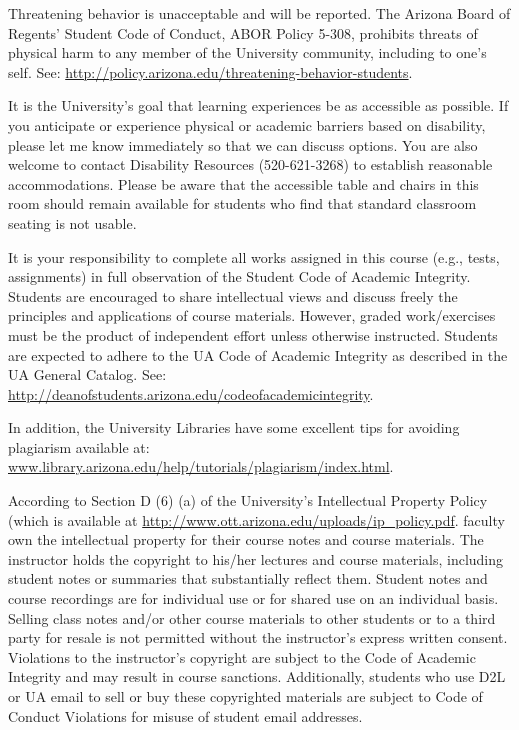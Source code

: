 \documentclass[
]{book}
\begin{document}
Threatening behavior is unacceptable and will be reported. The Arizona Board of Regents' Student Code of Conduct, ABOR Policy 5-308, prohibits threats of physical harm to any member of the University community, including to one's self. See: \url{http://policy.arizona.edu/threatening-behavior-students}.

It is the University's goal that learning experiences be as accessible as possible. If you anticipate or experience physical or academic barriers based on disability, please let me know immediately so that we can discuss options. You are also welcome to contact Disability Resources (520-621-3268) to establish reasonable accommodations. Please be aware that the accessible table and chairs in this room should remain available for students who find that standard classroom seating is not usable.

It is your responsibility to complete all works assigned in this course (e.g., tests, assignments) in full observation of the Student Code of Academic Integrity. Students are encouraged to share intellectual views and discuss freely the principles and applications of course materials. However, graded work/exercises must be the product of independent effort unless otherwise instructed. Students are expected to adhere to the UA Code of Academic Integrity as described in the UA General Catalog. See: \url{http://deanofstudents.arizona.edu/codeofacademicintegrity}.

In addition, the University Libraries have some excellent tips for avoiding plagiarism available at: \href{http:///url\%7Bwww.library.arizona.edu/help/tutorials/plagiarism/index.html}{www.library.arizona.edu/help/tutorials/plagiarism/index.html}.

According to Section D (6) (a) of the University's Intellectual Property Policy (which is available at \url{http://www.ott.arizona.edu/uploads/ip_policy.pdf}. faculty own the intellectual property for their course notes and course materials. The instructor holds the copyright to his/her lectures and course materials, including student notes or summaries that substantially reflect them. Student notes and course recordings are for individual use or for shared use on an individual basis. Selling class notes and/or other course materials to other students or to a third party for resale is not permitted without the instructor's express written consent. Violations to the instructor's copyright are subject to the Code of Academic Integrity and may result in course sanctions. Additionally, students who use D2L or UA email to sell or buy these copyrighted materials are subject to Code of Conduct Violations for misuse of student email addresses.
\end{document}
